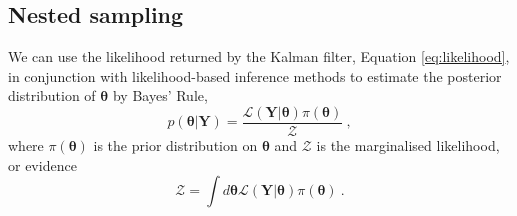 \documentclass[fleqn,usenatbib,useAMS]{mnras}
\providecommand{\DIFdelbegin}{} %
\providecommand{\DIFdelend}{} %
\newcommand{\DIFscaledelfig}{0.5}
\newlength{\DIFdelgraphicswidth} %
\newlength{\DIFdelgraphicsheight} %
\newcommand{\DIFdelincludegraphics}[2][]{%
\sbox{\DIFdelgraphicsbox}{\DIFOincludegraphics[#1]{#2}}%
\settoboxwidth{\DIFdelgraphicswidth}{\DIFdelgraphicsbox} %
\settoboxtotalheight{\DIFdelgraphicsheight}{\DIFdelgraphicsbox} %
\scalebox{\DIFscaledelfig}{%
\parbox[b]{\DIFdelgraphicswidth}{\usebox{\DIFdelgraphicsbox}\\[-\baselineskip] \rule{\DIFdelgraphicswidth}{0em}}\llap{\resizebox{\DIFdelgraphicswidth}{\DIFdelgraphicsheight}{%
\setlength{\unitlength}{\DIFdelgraphicswidth}%
\begin{picture}(1,1)%
\thicklines\linethickness{2pt} %
{\color[rgb]{1,0,0}\put(0,0){\framebox(1,1){}}}%
{\color[rgb]{1,0,0}\put(0,0){\line( 1,1){1}}}%
{\color[rgb]{1,0,0}\put(0,1){\line(1,-1){1}}}%
\end{picture}%
}\hspace*{3pt}}} %
} %
\DeclareRobustCommand{\DIFdelbegin}{\DIFOdelbegin \let\includegraphics\DIFdelincludegraphics} %
\DeclareRobustCommand{\DIFdelend}{\DIFOaddend \let\includegraphics\DIFOincludegraphics} %
\begin{document}
\DIFdelbegin %

\DIFdelend \subsection{Nested sampling}\label{sec:nested_sampling}
We can use the likelihood returned by the Kalman filter, Equation \eqref{eq:likelihood}, in conjunction with likelihood-based inference methods to estimate the posterior distribution of $\boldsymbol{\theta}$ by Bayes' Rule,
\begin{equation}
	p(\boldsymbol{\theta} | \boldsymbol{Y}) = \frac{\mathcal{L}(\boldsymbol{Y} | \boldsymbol{\theta}) \pi(\boldsymbol{\theta})}{\mathcal{Z}} \ ,
\end{equation}
where $\pi(\boldsymbol{\theta})$ is the prior distribution on $\boldsymbol{\theta}$ and $\mathcal{Z}$ is the marginalised likelihood, or evidence
\begin{equation}
	\mathcal{Z} = \int d \boldsymbol{\theta} \mathcal{L}(\boldsymbol{Y} | \boldsymbol{\theta})  \pi(\boldsymbol{\theta})  \ . \label{eq:model_evidence}
\end{equation}
\end{document}
